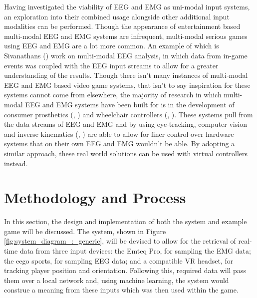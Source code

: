\documentclass[11pt, a4paper]{article}
\newcommand{\ccite}[1]{(\citeauthor{#1}, \citeyear{#1})}
\newcommand{\cciteyear}[1]{(\citeyear{#1})}
\newcommand{\reffig}[1]{Figure \ref{#1}}
\begin{document}
\hfill
  
Having investigated the viability of EEG and EMG as uni-modal input systems, an exploration into their combined usage alongside other additional input modalities can be performed. Though the appearance of entertainment based multi-modal EEG and EMG systems are infrequent, multi-modal serious games using EEG and EMG are a lot more common. An example of which is Sivanathans \cciteyear{sivanathan2014temporal} work on multi-modal EEG analysis, in which data from in-game events was coupled with the EEG input streams to allow for a greater understanding of the results. Though there isn't many instances of multi-modal EEG and EMG based video game systems, that isn't to say inspiration for these systems cannot come from elsewhere, the majority of research in which multi-modal EEG and EMG systems have been built for is in the development of consumer prosthetics \ccite{shi2019novel} and wheelchair controllers \ccite{carlson2013brain}. These systems pull from the data streams of EEG and EMG and by using eye-tracking, computer vision and inverse kinematics \ccite{mcmullen2013demonstration} are able to allow for finer control over hardware systems that on their own EEG and EMG wouldn't be able. By adopting a similar approach, these real world solutions can be used with virtual controllers instead. 







\pagebreak
\section{Methodology and Process}			%

In this section, the design and implementation of both the system and example game will be discussed. The system, shown in \reffig{fig:system_diagram_:_generic}, will be devised to allow for the retrieval of real-time data from three input devices: the Emteq Pro, for sampling the EMG data; the eego sports, for sampling EEG data; and a compatible VR headset, for tracking player position and orientation. Following this, required data will pass them over a local network and, using machine learning, the system would construe a meaning from these inputs which was then used within the game.
\end{document}

